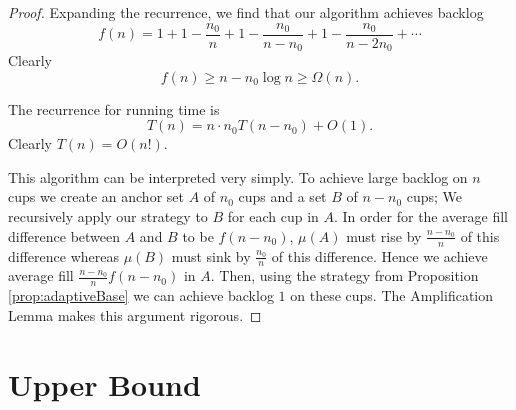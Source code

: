 \documentclass[twocolumn]{article}[10pt]
\begin{document}
\begin{proof}
  Expanding the recurrence, we find that our algorithm achieves backlog 
  $$f(n) = 1+ 1-\frac{n_0}{n} + 1-\frac{n_0}{n-n_0} + 1-\frac{n_0}{n-2n_0} + \cdots $$
  Clearly 
  $$f(n) \ge n - n_0 \log n \ge \Omega(n).$$

  The recurrence for running time is 
  $$T(n) = n \cdot n_0T(n-n_0)+O(1).$$
  Clearly $T(n) = O(n!)$.

  This algorithm can be interpreted very simply. To achieve large backlog on
  $n$ cups we create an anchor set $A$ of $n_0$ cups and a set $B$ of $n-n_0$
  cups; We recursively apply our strategy to $B$ for each cup in $A$. In
  order for the average fill difference between $A$ and $B$ to be $f(n-n_0)$,
  $\mu(A)$ must rise by $\frac{n-n_0}{n}$ of this difference whereas $\mu(B)$
  must sink by $\frac{n_0}{n}$ of this difference. Hence we achieve average
  fill $\frac{n-n_0}{n}f(n-n_0)$ in $A$. Then, using the strategy from
  Proposition \ref{prop:adaptiveBase} we can achieve backlog $1$ on these
  cups. The Amplification Lemma makes this argument rigorous.


\end{proof}


\section{Upper Bound}\label{sec:upperBound}
\end{document}
